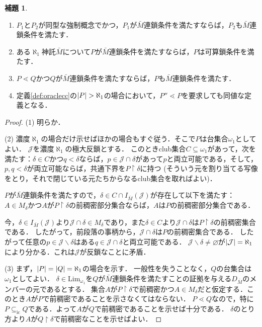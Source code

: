 \documentclass[uplatex]{jsarticle}
\newcommand{\restrict}{\upharpoonright}
\newcommand{\Lim}{\mathrm{Lim}}
\newcommand{\subsetic}{\subseteq_{\mathrm{ic}}}
\DeclarePairedDelimiter\abs{\lvert}{\rvert}
\renewcommand\emptyset{\varnothing}
\renewcommand\subset{\subseteq}
\renewcommand{\setminus}{\smallsetminus}
\theoremstyle{definition}
\newtheorem{lem}[thm]{補題}
\begin{document}
	\begin{lem}
		\begin{enumerate}
			\item $P_1$と$P_2$が同型な強制概念でかつ，$P_1$が$\bar{M}$連鎖条件を満たすならば，$P_2$も$\bar{M}$連鎖条件を満たす．
			\item ある$\aleph_1$神託$\bar{M}$について$P$が$\bar{M}$連鎖条件を満たすならば，$P$は可算鎖条件を満たす．
			\item $P \lessdot Q$かつ$Q$が$\bar{M}$連鎖条件を満たすならば，$P$も$\bar{M}$連鎖条件を満たす．
			\item 定義\ref{def:oraclecc}の$\abs{P} > \aleph_1$の場合において，$P'' \lessdot P$を要求しても同値な定義となる．
		\end{enumerate}
	\end{lem}
	\begin{proof}
		(1) 明らか．
		
		(2) 濃度$\aleph_1$の場合だけ示せばほかの場合もすぐ従う．そこで$P$は台集合$\omega_1$としてよい．
		$\mathcal{J}$を濃度$\aleph_1$の極大反鎖とする．
		このときclub集合$C \subset \omega_1$があって，次を満たす：$\delta \in C$かつ$q < \delta$ならば，$p \in \mathcal{J} \cap \delta$があって$p$と両立可能である，そして，$p, q < \delta$が両立可能ならば，共通下界を$P \restrict \delta$に持つ (そういう元を割り当てる写像をとり，それで閉じている元たちからなるclub集合を取ればよい)．
		
		$P$が$\bar{M}$連鎖条件を満たすので，$\delta \in C \cap I_{\bar{M}}(\mathcal{J})$が存在して以下を満たす：
		$A \in M_\delta$かつ$A$が$P \restrict \delta$の前稠密部分集合ならば，$A$は$P$の前稠密部分集合である．
		
		今，$\delta \in I_{\bar{M}}(\mathcal{J})$より$\mathcal{J} \cap \delta \in M_\delta$であり，また$\delta \in C$より$\mathcal{J} \cap \delta$は$P \restrict \delta$の前稠密集合である．
		したがって，前段落の事柄から，$\mathcal{J} \cap \delta$は$P$の前稠密集合である．
		したがって任意の$p \in \mathcal{J} \setminus \delta$はある$q \in \mathcal{J} \cap \delta$と両立可能である．
		$\mathcal{J} \setminus \delta \ne \emptyset$が$\abs{\mathcal{J}} = \aleph_1$により分かる．これは$\mathcal{J}$が反鎖なことに矛盾．
		
		(3) まず，$\abs{P} = \abs{Q} = \aleph_1$の場合を示す．
		一般性を失うことなく，$Q$の台集合は$\omega_1$としてよい．
		$\delta \in \Lim_{\omega_1}$を$Q$が$\bar{M}$連鎖条件を満たすことの証拠を与える$D_{\bar{M}}$のメンバーの元であるとする．
		集合$A$が$P \restrict \delta$で前稠密かつ$A \in M_\delta$だと仮定する．このとき$A$が$P$で前稠密であることを示さなくてはならない．
		$P \lessdot Q$なので，特に$P \subsetic Q$である．よって$A$が$Q$で前稠密であることを示せば十分である．
		$\delta$のとり方より$A$が$Q \restrict \delta$で前稠密なことを示せばよい．
		

\end{proof}
\end{document}
